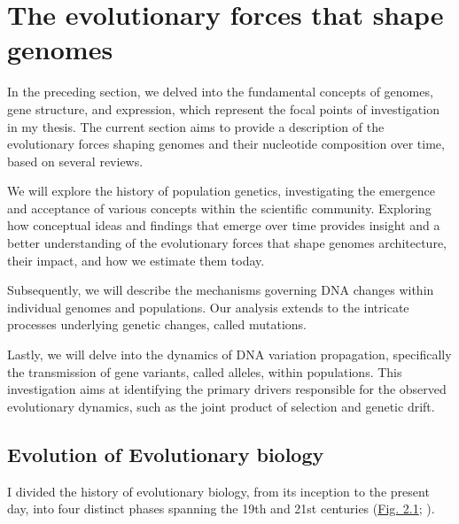 \thispagestyle{empty}
\chapter{The evolutionary forces that shape genomes}
\vspace*{-20pt}
{\hypersetup{linkcolor=GREYDARK}\minitoc}
\label{chap:intro-evol_forces}

In the preceding section, we delved into the fundamental concepts of genomes, gene structure, and expression, which represent the focal points of investigation in my thesis. The current section aims to provide a description of the evolutionary forces shaping genomes and their nucleotide composition over time, based on several reviews. %

We will explore the history of population genetics, investigating the emergence and acceptance of various concepts within the scientific community. Exploring how conceptual ideas and findings that emerge over time provides insight and a better understanding of the evolutionary forces that shape genomes architecture, their impact, and how we estimate them today.

Subsequently, we will describe the mechanisms governing \acrshort{DNA} changes within individual genomes and populations. Our analysis extends to the intricate processes underlying genetic changes, called mutations.

Lastly, we will delve into the dynamics of \acrshort{DNA} variation propagation, specifically the transmission of gene variants, called alleles, within populations. This investigation aims at identifying the primary drivers responsible for the observed evolutionary dynamics, such as the joint product of selection and genetic drift.

\section{Evolution of Evolutionary biology}

I divided the history of evolutionary biology, from its inception to the present day, into four distinct phases spanning the 19th and 21st centuries (\hyperref[fig:chronology_bioevol]{Fig. 2.1}; \citet{riede_why_2010}).

